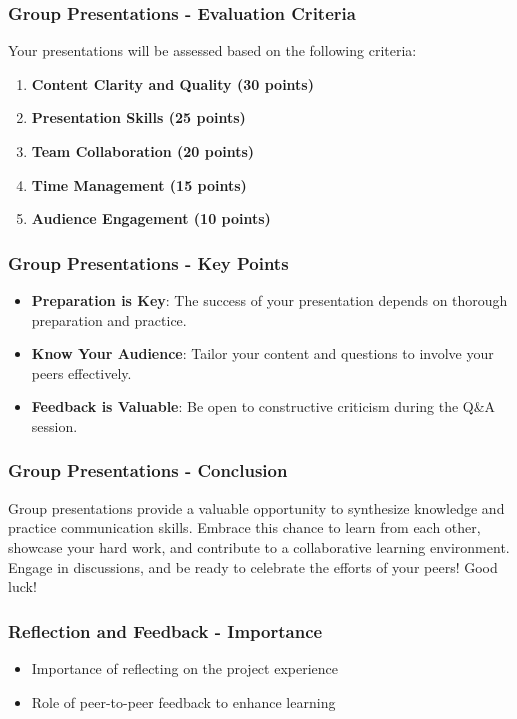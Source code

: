 \documentclass{beamer}
\begin{document}
\begin{frame}[fragile]
    \frametitle{Group Presentations - Evaluation Criteria}
    Your presentations will be assessed based on the following criteria:
    \begin{enumerate}
        \item \textbf{Content Clarity and Quality (30 points)}
        \item \textbf{Presentation Skills (25 points)}
        \item \textbf{Team Collaboration (20 points)}
        \item \textbf{Time Management (15 points)}
        \item \textbf{Audience Engagement (10 points)}
    \end{enumerate}
\end{frame}

\begin{frame}[fragile]
    \frametitle{Group Presentations - Key Points}
    \begin{itemize}
        \item \textbf{Preparation is Key}: The success of your presentation depends on thorough preparation and practice.
        \item \textbf{Know Your Audience}: Tailor your content and questions to involve your peers effectively.
        \item \textbf{Feedback is Valuable}: Be open to constructive criticism during the Q\&A session.
    \end{itemize}
\end{frame}

\begin{frame}[fragile]
    \frametitle{Group Presentations - Conclusion}
    Group presentations provide a valuable opportunity to synthesize knowledge and practice communication skills. 
    Embrace this chance to learn from each other, showcase your hard work, and contribute to a collaborative learning environment. 
    Engage in discussions, and be ready to celebrate the efforts of your peers! Good luck!
\end{frame}

\begin{frame}[fragile]
    \frametitle{Reflection and Feedback - Importance}
    \begin{itemize}
        \item Importance of reflecting on the project experience
        \item Role of peer-to-peer feedback to enhance learning
    \end{itemize}
\end{frame}
\end{document}
